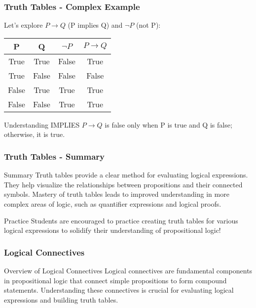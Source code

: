 \documentclass[aspectratio=169]{beamer}
\begin{document}
\begin{frame}[fragile]
    \frametitle{Truth Tables - Complex Example}
    Let’s explore $P \rightarrow Q$ (P implies Q) and $\neg P$ (not P):

    \begin{center}
        \begin{tabular}{|c|c|c|c|}
            \hline
            P     & Q     & $\neg P$    & $P \rightarrow Q$ \\
            \hline
            True  & True  & False & True  \\
            True  & False & False & False \\
            False & True  & True  & True  \\
            False & False & True  & True  \\
            \hline
        \end{tabular}
    \end{center}

    \begin{block}{Understanding IMPLIES}
        $P \rightarrow Q$ is false only when P is true and Q is false; otherwise, it is true.
    \end{block}
\end{frame}

\begin{frame}[fragile]
    \frametitle{Truth Tables - Summary}
    \begin{block}{Summary}
        Truth tables provide a clear method for evaluating logical expressions. They help visualize the relationships between propositions and their connected symbols. Mastery of truth tables leads to improved understanding in more complex areas of logic, such as quantifier expressions and logical proofs.
    \end{block}
    
    \begin{block}{Practice}
        Students are encouraged to practice creating truth tables for various logical expressions to solidify their understanding of propositional logic!
    \end{block}
\end{frame}

\begin{frame}[fragile]
    \frametitle{Logical Connectives}
    \begin{block}{Overview of Logical Connectives}
        Logical connectives are fundamental components in propositional logic that connect simple propositions to form compound statements. 
        Understanding these connectives is crucial for evaluating logical expressions and building truth tables.
    \end{block}
\end{frame}
\end{document}
